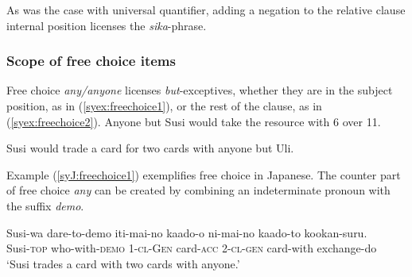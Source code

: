 \documentclass[output=paper]{langscibook}
\begin{document}
\z

As was the case with universal quantifier, adding a negation to the relative clause internal position licenses the \emph{sika}-phrase.

\z


%
        
\subsubsection{Scope of free choice items}
Free choice \emph{any/anyone} licenses \emph{but}-exceptives, whether they are in the subject position, as in (\ref{syex:freechoice1}), or the rest of the clause, as in (\ref{syex:freechoice2}). 
\ea \label{syex:freechoice1}
Anyone but Susi would take the resource with 6 over 11.\z

\ea \label{syex:freechoice2}
Susi would trade a card for two cards with anyone but Uli.\z

Example (\ref{syJ:freechoice1}) exemplifies free choice in Japanese. The counter part of free choice \emph{any} can be created by combining an indeterminate pronoun with the suffix \emph{demo}. 

\ea \label{syJ:freechoice1}
\gll Susi-wa dare-to-demo iti-mai-no kaado-o ni-mai-no kaado-to kookan-suru.\\
Susi-\textsc{top} who-with-\textsc{demo} 1-\textsc{cl}-\textsc{Gen} card-\textsc{acc} 2-\textsc{cl}-\textsc{gen} card-with exchange-do\\
\glt `Susi trades a card with two cards with anyone.'\z
\end{document}
